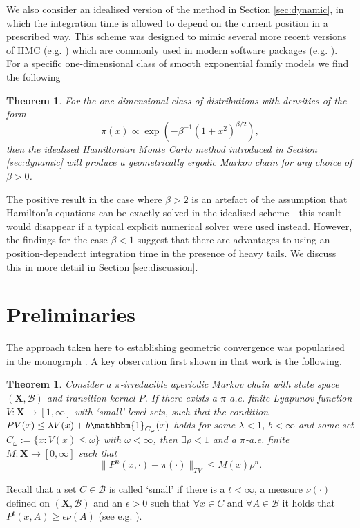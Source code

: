 \documentclass[bj,numbers,noshowframe]{imsart}
\newcommand{\X}{\mathbf{X}}
\theoremstyle{definition}
\theoremstyle{plain}
\newtheorem{thm}[defn]{Theorem}
\theoremstyle{definition}
\begin{document}
We also consider an idealised version of the method in Section \ref{sec:dynamic}, in which the integration time is allowed to depend on the current position in a prescribed way.  This scheme was designed to mimic several more recent versions of HMC (e.g. \citep{hoffman-gelman:2013}) which are commonly used in modern software packages (e.g. \citep{carpenter2016stan}). For a specific one-dimensional class of smooth exponential family models we find the following 

\begin{thm}
For the one-dimensional class of distributions with densities of the form
\[
\pi(x) \propto \exp \left( -\beta^{-1} (1+x^2)^{\beta/2} \right),
\]
then the idealised Hamiltonian Monte Carlo method introduced in Section \ref{sec:dynamic} will produce a geometrically ergodic Markov chain for any choice of $\beta>0$.
\end{thm}

The positive result in the case where $\beta>2$ is an artefact of the assumption that Hamilton's equations can be exactly solved in the idealised scheme - this result would disappear if a typical explicit numerical solver were used instead.  However, the findings for the case $\beta<1$ suggest that there are advantages to using an position-dependent integration time in the presence of heavy tails.  We discuss this in more detail in Section \ref{sec:discussion}.

\section{Preliminaries}
\label{sec:prelim}

The approach taken here to establishing geometric convergence was popularised in the monograph \citep{meyn2012markov}.  A key observation first shown in that work is the following.

\begin{thm}
Consider a $\pi$-irreducible aperiodic Markov chain with state space $(\mathbf{X}, \mathcal{B})$ and transition kernel $P$. If there exists a $\pi$-a.e. finite \emph{Lyapunov} function $V:\X \to [1,\infty]$ with `small' level sets, such that the condition $PV(x) \leq \lambda V(x) + b\mathbbm{1}_{C_\omega}(x)$ holds for some $\lambda < 1$, $b<\infty$ and some set $C_\omega:=\{x : V(x)\leq \omega\}$ with $\omega<\infty$, then $\exists \rho<1$ and a $\pi$-a.e. finite $M:\X\to[0,\infty]$ such that
\begin{equation} \label{eqn:geoerg}
\|P^n(x,\cdot) - \pi(\cdot)\|_{TV} \leq M(x)\rho^n.
\end{equation}
\end{thm}
Recall that a set $C \in \mathcal{B}$ is called `small' if there is a $t<\infty$, a measure $\nu(\cdot)$ defined on $(\mathbf{X},\mathcal{B})$ and an $\epsilon>0$ such that $\forall x \in C$ and $\forall A \in \mathcal{B}$ it holds that $P^t(x,A) \geq \epsilon \nu(A)$ (see e.g. \citep{roberts2004general}).
\end{document}
